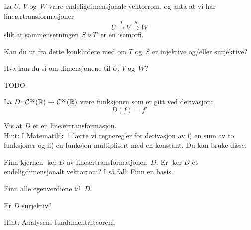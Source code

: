 \begin{oppgave}
La $U$, $V$ og~$W$ være endeligdimensjonale vektorrom, og
anta at vi har lineærtransformasjoner
\[
U \xrightarrow{T} V \xrightarrow{S} W
\]
slik at sammensetningen $S \circ T$ er en isomorfi.
\begin{punkt}
Kan du ut fra dette konkludere med om $T$ og~$S$ er injektive og/eller
surjektive?
\end{punkt}
\begin{punkt}
Hva kan du si om dimensjonene til $U$, $V$ og~$W$?
\end{punkt}
\end{oppgave}

\begin{losning}
TODO
\end{losning}


\begin{oppgave}
La $D \colon \mathcal{C}^\infty(\mathbb{R})\rightarrow \mathcal{C}^\infty(\mathbb{R})$
være funksjonen som er gitt ved derivasjon:
\[
D(f)=f'
\]
\begin{punkt}
Vis at $D$ er en lineærtransformasjon.
\\
Hint: I Matematikk~1 lærte vi regneregler for derivasjon av i) en sum
av to funksjoner og ii) en funksjon multiplisert med en konstant. Du
kan bruke disse.
\end{punkt}

\begin{punkt}
Finn kjernen $\ker D$ av lineærtransformasjonen~$D$.
Er $\ker D$ et endeligdimensjonalt vektorrom?  I så fall: Finn en basis.
\end{punkt}

\begin{punkt}
Finn alle egenverdiene til~$D$.
%
\end{punkt}

\begin{punkt}
Er $D$ surjektiv?

\noindent
Hint: Analysens fundamentalteorem.
\end{punkt}

\end{oppgave}

